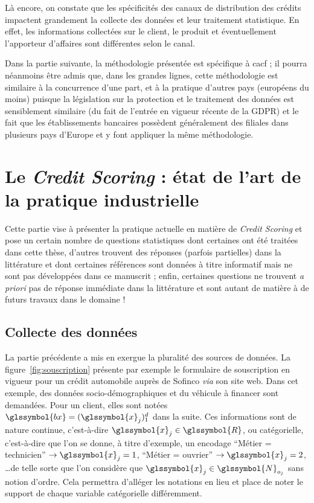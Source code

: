 Là encore, on constate que les spécificités des canaux de distribution des crédits impactent grandement la collecte des données et leur traitement statistique. En effet, les informations collectées sur le client, le produit et éventuellement l'apporteur d'affaires sont différentes selon le canal.

Dans la partie suivante, la méthodologie présentée est spécifique à \gls{cacf} ; il pourra néanmoins être admis que, dans les grandes lignes, cette méthodologie est similaire à la concurrence d'une part, et à la pratique d'autres pays (européens du moins) puisque la législation sur la protection et le traitement des données est sensiblement similaire (du fait de l'entrée en vigueur récente de la GDPR) et le fait que les établissements bancaires possèdent généralement des filiales dans plusieurs pays d'Europe et y font appliquer la même méthodologie.


\section{Le \textit{Credit Scoring} : état de l'art de la pratique industrielle} \label{chap1:sec2}

Cette partie vise à présenter la pratique actuelle en matière de \textit{Credit Scoring} et pose un certain nombre de questions statistiques dont certaines ont été traitées dans cette thèse, d'autres trouvent des réponses (parfois partielles) dans la littérature et dont certaines références sont données à titre informatif mais ne sont pas développées dans ce manuscrit ; enfin, certaines questions ne trouvent \textit{a priori} pas de réponse immédiate dans la littérature et sont autant de matière à de futurs travaux dans le domaine !

\subsection{Collecte des données}

La partie précédente a mis en exergue la pluralité des sources de données. La figure~\ref{fig:souscription} présente par exemple le formulaire de souscription en vigueur pour un crédit automobile auprès de Sofinco \textit{via} son site web. Dans cet exemple, des données socio-démographiques et du véhicule à financer sont demandées. Pour un client, elles sont notées $\glssymbol{bx} = (\glssymbol{x}_j)_1^d$ dans la suite. Ces informations sont de nature continue, c'est-à-dire $\glssymbol{x}_j \in \glssymbol{R}$, ou catégorielle, c'est-à-dire que l'on se donne, à titre d'exemple, un encodage ``Métier = technicien'' $\rightarrow \glssymbol{x}_j = 1$, ``Métier = ouvrier'' $\rightarrow \glssymbol{x}_j = 2$, \dots de telle sorte que l'on considère que $\glssymbol{x}_j \in \glssymbol{N}_{o_j}$ sans notion d'ordre. Cela permettra d'alléger les notations en lieu et place de noter le support de chaque variable catégorielle différemment.

